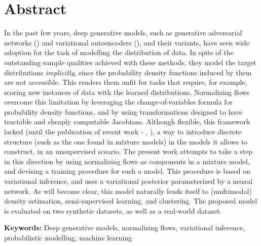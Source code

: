 \section*{Abstract}


In the past few years, deep generative models, such as generative adversarial networks
(\autocite{GAN}) and variational autoencoders (\autocite{vaepaper}), and their variants,
have seen wide adoption for the task of modelling the distribution of data.
In spite of the outstanding sample qualities achieved with these methods,
they model the target distributions \emph{implicitly}, since the probability
density functions induced by them are not accessible. This renders them unfit for
tasks that require, for example, scoring new instances of data with the learned
distributions. Normalizing flows overcome this limitation by leveraging the
change-of-variables formula for probability density functions, and by using
transformations designed to have tractable and cheaply computable Jacobians. Although
flexible, this framework lacked (until the publication of recent work -
\autocite{semisuplearning_nflows}, \autocite{RAD}), a way to introduce discrete
structure (such as the one found in mixture models) in the models it allows to
construct, in an unsupervised sceario. The present work attempts to take a step
in this direction by using normalizing flows as components in a mixture model,
and devising a training procedure for such a model.
This procedure is based on variational inference, and uses a variational posterior
parameterized by a neural network. As will become clear, this model naturally
lends itself to (multimodal) density estimation, semi-supervised learning, and
clustering. The proposed model is evaluated on two synthetic datasets, as well
as a real-world dataset.
\vfill

\textbf{\Large Keywords:} Deep generative models, normalizing flows, variational
inference, probabilistic modelling, machine learning
